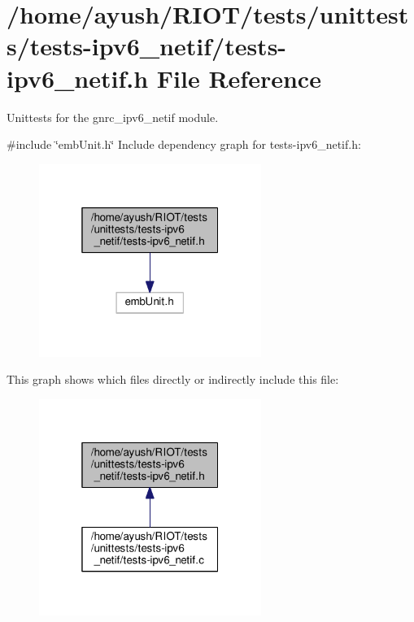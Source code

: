 \hypertarget{tests-ipv6__netif_8h}{}\section{/home/ayush/\+R\+I\+O\+T/tests/unittests/tests-\/ipv6\+\_\+netif/tests-\/ipv6\+\_\+netif.h File Reference}
\label{tests-ipv6__netif_8h}


Unittests for the {\ttfamily gnrc\+\_\+ipv6\+\_\+netif} module.  


{\ttfamily \#include \char`\"{}emb\+Unit.\+h\char`\"{}}\newline
Include dependency graph for tests-\/ipv6\+\_\+netif.h\+:
\nopagebreak
\begin{figure}[H]
\begin{center}
\leavevmode
\includegraphics[width=205pt]{tests-ipv6__netif_8h__incl}
\end{center}
\end{figure}
This graph shows which files directly or indirectly include this file\+:
\nopagebreak
\begin{figure}[H]
\begin{center}
\leavevmode
\includegraphics[width=205pt]{tests-ipv6__netif_8h__dep__incl}
\end{center}
\end{figure}
